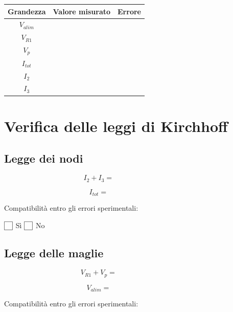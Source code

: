 \documentclass[a4paper,12pt]{article}
\begin{document}
\begin{center}
\begin{tabular}{|c|c|c|}
\hline
Grandezza & Valore misurato & Errore \\
\hline
$V_{alim}$ & & \\
\hline
$V_{R1}$ & & \\
\hline
$V_p$ & & \\
\hline
$I_{tot}$ & & \\
\hline
$I_2$ & & \\
\hline
$I_3$ & & \\
\hline
\end{tabular}
\end{center}

\vspace{1cm}

\section*{Verifica delle leggi di Kirchhoff}

\subsection*{Legge dei nodi}

\[
I_2 + I_3 = \hspace{4cm}
\]

\[
I_{tot} = \hspace{4cm}
\]

Compatibilità entro gli errori sperimentali:

\vspace{0.3cm}

\noindent
$\fbox{\rule{0pt}{1.2ex}\hspace{1.2ex}}$ Sì \hspace{2cm} $\fbox{\rule{0pt}{1.2ex}\hspace{1.2ex}}$ No

\vspace{1cm}

\subsection*{Legge delle maglie}

\[
V_{R1} + V_p = \hspace{4cm}
\]

\[
V_{alim} = \hspace{4cm}
\]

Compatibilità entro gli errori sperimentali:
\end{document}
